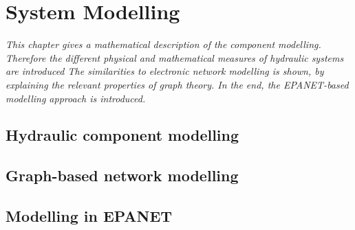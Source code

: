 \chapter{System Modelling}
\label{system_modelling}

\emph{This chapter gives a mathematical description of the component modelling. Therefore the different physical and mathematical measures of hydraulic systems are introduced The similarities to electronic network modelling is shown, by explaining the relevant properties of graph theory. In the end, the EPANET-based modelling approach is introduced.}

\section{Hydraulic component modelling}
\label{hydraulic_component_modelling}

\section{Graph-based network modelling}
\label{graph_based_network_modelling}

\section{Modelling in EPANET}
\label{modelling_in_epanet}